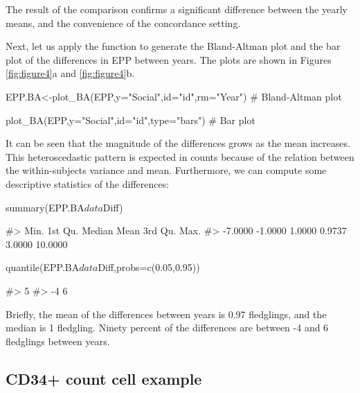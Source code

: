The result of the comparison confirms a significant difference between
the yearly means, and the convenience of the concordance setting.

Next, let us apply the function  to generate the
Bland-Altman plot and the bar plot of the differences in EPP between
years. The plots are shown in Figures \ref{fig:figure4}a and
\ref{fig:figure4}b.

\begin{Schunk}
\begin{Sinput}
EPP.BA<-plot_BA(EPP,y="Social",id="id",rm="Year") # Bland-Altman plot
\end{Sinput}
\end{Schunk}

\begin{Schunk}
\begin{Sinput}
plot_BA(EPP,y="Social",id="id",type="bars") # Bar plot
\end{Sinput}
\end{Schunk}

It can be seen that the magnitude of the differences grows as the mean
increases. This heteroscedastic pattern is expected in counts because of
the relation between the within-subjects variance and mean. Furthermore,
we can compute some descriptive statistics of the differences:

\begin{Schunk}
\begin{Sinput}
summary(EPP.BA$data$Diff)
\end{Sinput}
\begin{Soutput}
#>    Min. 1st Qu.  Median    Mean 3rd Qu.    Max. 
#> -7.0000 -1.0000  1.0000  0.9737  3.0000 10.0000
\end{Soutput}
\begin{Sinput}
quantile(EPP.BA$data$Diff,probs=c(0.05,0.95))
\end{Sinput}
\begin{Soutput}
#>  5% 95% 
#>  -4   6
\end{Soutput}
\end{Schunk}

Briefly, the mean of the differences between years is 0.97 fledglings,
and the median is 1 fledgling. Ninety percent of the differences are
between -4 and 6 fledglings between years.

\hypertarget{cd34-count-cell-example}{%
\subsection{CD34+ count cell example}\label{cd34-count-cell-example}}

